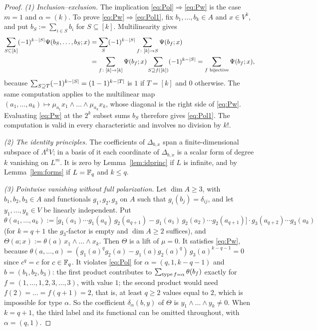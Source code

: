 \begin{proof}
\emph{(1) Inclusion--exclusion.} The implication \eqref{eq:Pol}$\Rightarrow$\eqref{eq:Pw} is the case $m=1$ and
$\alpha=(k)$. To prove \eqref{eq:Pw}$\Rightarrow$\eqref{eq:Pol1}, fix $b_1,\dots,b_k\in A$ and $x\in V^k$, and put
$b_S:=\sum_{i\in S}b_i$ for $S\subseteq[k]$. Multilinearity gives
\begin{align*}
\sum_{S\subseteq[k]}(-1)^{k-\lvert S\rvert}\Psi(b_S,\dots,b_S;x)&=\sum_S(-1)^{k-\lvert S\rvert}\sum_{f\colon[k]\to S}\Psi(b_f;x)\\
&=\sum_{f\colon[k]\to[k]}\Psi(b_f;x)\sum_{S\supseteq f([k])}(-1)^{k-\lvert S\rvert}=\sum_{f\text{ bijective}}\Psi(b_f;x),
\end{align*}
because $\sum_{S\supseteq T}(-1)^{k-\lvert S\rvert}=(1-1)^{k-\lvert T\rvert}$ is $1$ if $T=[k]$ and $0$ otherwise. The same computation
applies to the multilinear map $(a_1,\dots,a_k)\mapsto \mu_{a_1}x_1\wedge\dots\wedge \mu_{a_k}x_k$, whose diagonal is the right
side of \eqref{eq:Pw}. Evaluating \eqref{eq:Pw} at the $2^k$ subset sums $b_S$ therefore gives \eqref{eq:Pol1}.
The computation is valid in every characteristic and involves no division by $k!$.

\emph{(2) The identity principles.} The coefficients of $\Delta_{b,x}$ span a finite-dimensional subspace of $\Lambda^kV$; in a basis of it each
coordinate of $\Delta_{b,x}$ is a scalar form of degree $k$ vanishing on $L^m$. It is zero by Lemma~\ref{lem:idprinc}
if $L$ is infinite, and by Lemma~\ref{lem:forms} if $L=\mathbb F_q$ and $k\le q$.

\emph{(3) Pointwise vanishing without full polarization.} Let $\dim A\ge3$, with $b_1,b_2,b_3\in A$ and functionals $g_1,g_2,g_3$ on $A$ such that
$g_i(b_j)=\delta_{ij}$, and let $y_1,\dots,y_k\in V$ be linearly independent. Put
\[
\theta(a_1,\dots,a_k):=\bigl[g_1(a_1)\cdots g_1(a_q)\,g_2(a_{q+1})-g_1(a_1)\,g_2(a_2)\cdots g_2(a_{q+1})\bigr]
\cdot g_3(a_{q+2})\cdots g_3(a_k)
\]
(for $k=q+1$ the $g_3$\nobreakdash-factor is empty and $\dim A\ge2$ suffices), and $\Theta(a;x):=\theta(a)\,x_1\wedge\dots\wedge x_k$.
Then $\Theta$ is a lift of $\mu=0$. It satisfies \eqref{eq:Pw}, because
$\theta(a,\dots,a)=(g_1(a)^qg_2(a)-g_1(a)g_2(a)^q)\,g_3(a)^{k-q-1}=0$ since $c^q=c$ for $c\in\mathbb F_q$. It
violates \eqref{eq:Pol} for $\alpha=(q,1,k-q-1)$ and $b=(b_1,b_2,b_3)$: the first product contributes to
$\sum_{\operatorname{type} f=\alpha}\theta(b_f)$ exactly for $f=(1,\dots,1,2,3,\dots,3)$, with value $1$; the second product would need
$f(2)=\dots=f(q+1)=2$, that is, at least $q\ge2$ values equal to $2$, which is impossible for type $\alpha$. So the
coefficient $\delta_\alpha(b,y)$ of $\Theta$ is $y_1\wedge\dots\wedge y_k\neq0$. When $k=q+1$, the third label and its
functional can be omitted throughout, with $\alpha=(q,1)$.


\end{proof}
